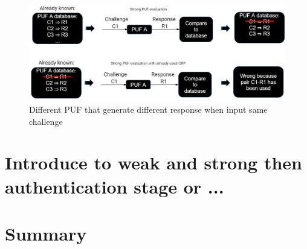 \begin{figure}[ht]
    \centering
    \includegraphics[width=15cm]{figures/figure3.jpg}
    \caption{Different PUF that generate different response when input same challenge}
    \label{fig:figure3}
    \end{figure}

\section{Introduce to weak and strong then authentication stage or ...}

\section{Summary}


